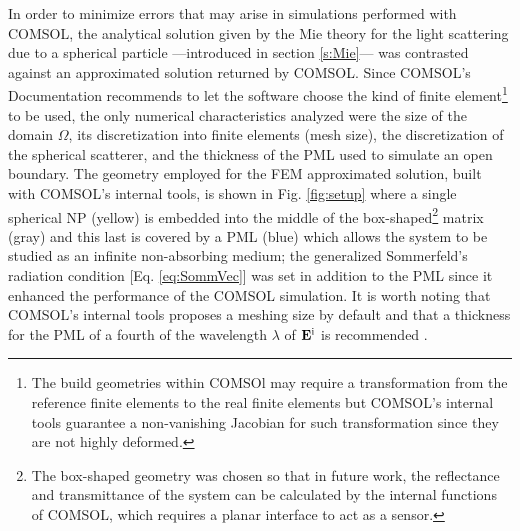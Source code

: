 In order to minimize errors that may arise in simulations performed with COMSOL, the analytical solution given by the Mie theory for the light scattering due to a spherical particle ---introduced in section \ref{s:Mie}--- was contrasted against an approximated solution returned by COMSOL. Since COMSOL's Documentation \cite{comsol_doc} recommends to let the software choose the kind of finite element\footnote{The build geometries within COMSOl may require a transformation from the reference finite elements to the real finite elements but COMSOL's internal tools guarantee a non-vanishing Jacobian for such transformation since they are not highly deformed\cite{comsol_doc, dhatt_finite_2012}.} to be used, the only numerical characteristics analyzed were the size of the domain $\Omega$, its discretization into finite elements (mesh size), the discretization of the spherical scatterer, and the thickness of the PML used to simulate an open boundary. The geometry employed for the FEM approximated solution, built with COMSOL's internal tools, is shown in Fig. \ref{fig:setup} where a single spherical NP (yellow) is embedded into  the middle of the box-shaped\footnote{The box-shaped geometry was chosen so that in future work, the reflectance and transmittance of the system can be calculated by the internal functions of COMSOL, which requires a planar interface to act as a sensor.} matrix (gray) and this last is covered by a PML (blue) which allows the system to be studied as an infinite non-absorbing medium; the generalized Sommerfeld's radiation condition [Eq. \eqref{eq:SommVec}] was set in addition to the PML since it enhanced the performance of the COMSOL simulation. It is worth noting that COMSOL's internal tools proposes a meshing size by default \cite{comsol_doc} and that a thickness for the PML of a fourth of the wavelength $\lambda$ of $\vb{E}^\text{i}$ is recommended \cite{comsol_wave}.


